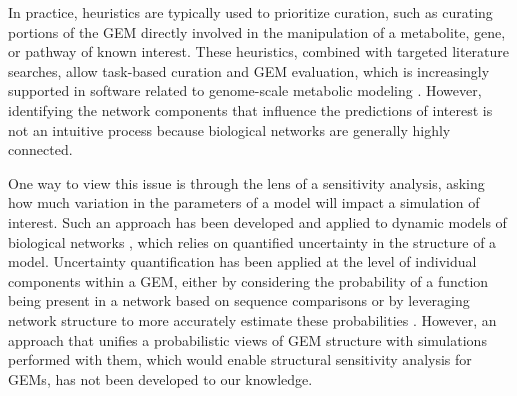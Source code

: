\documentclass[11pt,twocolumn,notitlepage,openany,twoside]{book}
\begin{document}
\begin{refsection}
In practice, heuristics are typically used to prioritize curation, such as curating portions of the GEM directly involved in the manipulation of a metabolite, gene, or pathway of known interest. These heuristics, combined with targeted literature searches, allow task-based curation and GEM evaluation, which is increasingly supported in software related to genome-scale metabolic modeling \cite{Lieven2018-fo, Wang2018-yn}. However, identifying the network components that influence the predictions of interest is not an intuitive process because biological networks are generally highly connected.

One way to view this issue is through the lens of a sensitivity analysis, asking how much variation in the parameters of a model will impact a simulation of interest. Such an approach has been developed and applied to dynamic models of biological networks \cite{Babtie2014-vy}, which relies on quantified uncertainty in the structure of a model. Uncertainty quantification has been applied at the level of individual components within a GEM, either by considering the probability of a function being present in a network based on sequence comparisons \cite{Benedict2014-yo} or by leveraging network structure to more accurately estimate these probabilities \cite{Plata2012-ys}. However, an approach that unifies a probabilistic views of GEM structure with simulations performed with them, which would enable structural sensitivity analysis for GEMs, has not been developed to our knowledge.


\end{refsection}
\end{document}
